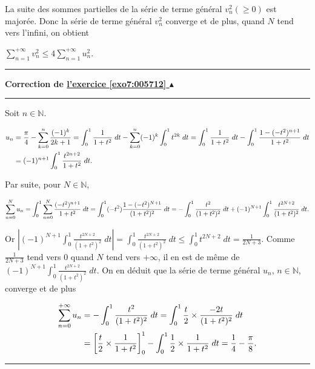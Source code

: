 \documentclass[11pt,a4paper]{article}
\newcommand{\Nn}{\mathbb{N}} \newcommand{\N}{\mathbb{N}}
\newcounter{exo}
\newcommand{\correction}[1]{\hypertarget{cor7:#1}{}\label{cor7:#1}{\bf Correction de \hyperlink{exo7:#1}{l'exercice \ref{exo7:#1} $\blacktriangle$}}\vspace{1mm}\hrule\vspace{1mm}}
\newcommand{\fincorrection}{\vspace{1mm}\hrule\vspace*{7mm}}
\begin{document}
La suite des sommes partielles de la série de terme général $v_n^2(\geqslant0)$ est majorée. Donc la série de terme général $v_n^2$ converge et de plus, quand $N$ tend vers l'infini, on obtient

\begin{center}
$\sum_{n=1}^{+\infty}v_n^2\leqslant 4\sum_{n=1}^{+\infty}u_n^2$.
\end{center} 
\fincorrection
\correction{005712}
Soit $n\in\Nn$.

\begin{align*}\ensuremath
u_n&=\frac{\pi}{4}-\sum_{k=0}^{n}\frac{(-1)^k}{2k+1}=\int_{0}^{1}\frac{1}{1+t^2}\;dt-\sum_{k=0}^{n}(-1)^k\int_{0}^{1}t^{2k}\;dt=\int_{0}^{1}\frac{1}{1+t^2}\;dt-\int_{0}^{1}\frac{1-(-t^2)^{n+1}}{1+t^2}\;dt\\
 &= (-1)^{n+1}\int_{0}^{1}\frac{t^{2n+2}}{1+t^2}\;dt.
\end{align*}

Par suite, pour $N\in\Nn$,

\begin{align*}\ensuremath
\sum_{n=0}^{N}u_n=\int_{0}^{1}\sum_{n=0}^{N}\frac{(-t^2)^{n+1}}{1+t^2}\;dt  =\int_{0}^{1}(-t^2)\frac{1-(-t^2)^{N+1}}{(1+t^2)^2}\;dt=-\int_{0}^{1}\frac{t^2}{(1+t^2)^2}\;dt+(-1)^{N+1}\int_{0}^{1}\frac{t^{2N+2}}{(1+t^2)^2}\;dt.
\end{align*}

Or $\left|(-1)^{N+1}\int_{0}^{1}\frac{t^{2N+2}}{(1+t^2)^2}\;dt\right|=\int_{0}^{1}\frac{t^{2N+2}}{(1+t^2)^2}\;dt\leqslant\int_{0}^{1}t^{2N+2}\;dt=\frac{1}{2N+3}$. Comme $\frac{1}{2N+3}$ tend vers $0$ quand $N$ tend vers $+\infty$, il en est de même de $(-1)^{N+1}\int_{0}^{1}\frac{t^{2N+2}}{(1+t^2)^2}\;dt$. On en déduit que la série de terme général $u_n$, $n\in\Nn$, converge et de plus

\begin{align*}\ensuremath
\sum_{n=0}^{+\infty}u_n&=-\int_{0}^{1}\frac{t^2}{(1+t^2)^2}\;dt=\int_{0}^{1}\frac{t}{2}\times\frac{-2t}{(1+t^2)^2}\;dt\\
 &=\left[\frac{t}{2}\times\frac{1}{1+t^2}\right]_0^1-\int_{0}^{1}\frac{1}{2}\times\frac{1}{1+t^2}\;dt=\frac{1}{4}-\frac{\pi}{8}.
\end{align*}

\begin{center}
\end{center}
\fincorrection
\end{document}
